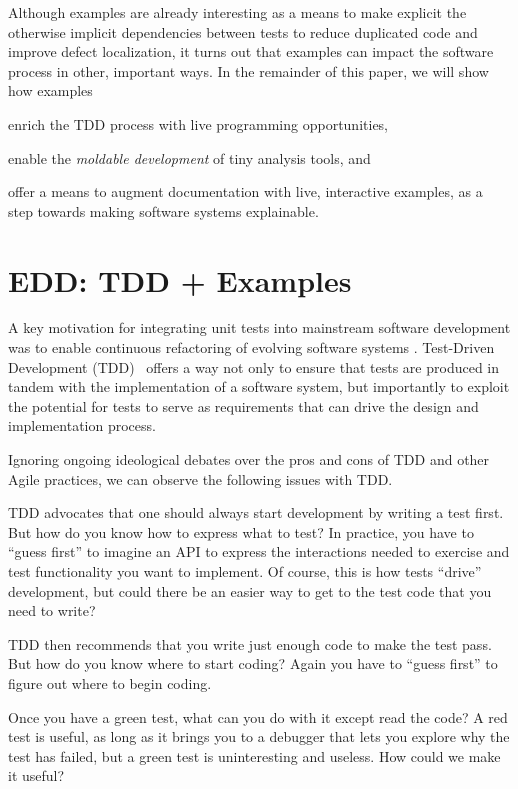 \documentclass[sigplan,anonymous,review,10pt]{acmart}
\begin{document}
Although examples are already interesting as a means to make explicit the otherwise implicit dependencies between tests to reduce duplicated code and improve defect localization, it turns out that examples can impact the software process in other, important ways.
In the remainder of this paper, we will show how examples
\begin{inparaenum}[(i)]
	\item enrich the TDD process with live programming opportunities,
	\item enable the \emph{moldable development} of tiny analysis tools, and
	\item offer a means to augment documentation with live, interactive examples, as a step towards making software systems explainable.
\end{inparaenum}

\section{EDD: TDD + Examples}\label{sec:edd}

A key motivation for integrating unit tests into mainstream software development was to enable continuous refactoring of evolving software systems \cite{Beck00a}.
Test-Driven Development (TDD)~\cite{Beck03a} offers a way not only to ensure that tests are produced in tandem with the implementation of a software system, but importantly to exploit the potential for tests to serve as requirements that can drive the design and implementation process.

Ignoring ongoing ideological debates over the pros and cons of TDD and other Agile practices, we can observe the following issues with TDD.
\begin{inparaenum}[(i)]
	\item TDD advocates that one should always start development by writing a test first.
But how do you know how to express what to test?
In practice, you have to ``guess first'' to imagine an API to express the interactions needed to exercise and test functionality you want to implement.
Of course, this is how tests ``drive'' development, but could there be an easier way to get to the test code that you need to write?
	\item TDD then recommends that you write just enough code to make the test pass.
But how do you know where to start coding?
Again you have to ``guess first'' to figure out where to begin coding.
	\item Once you have a green test, what can you do with it except read the code?
A red test is useful, as long as it brings you to a debugger that lets you explore why the test has failed, but a green test is uninteresting and useless.
How could we make it useful?
\end{inparaenum}
\end{document}
